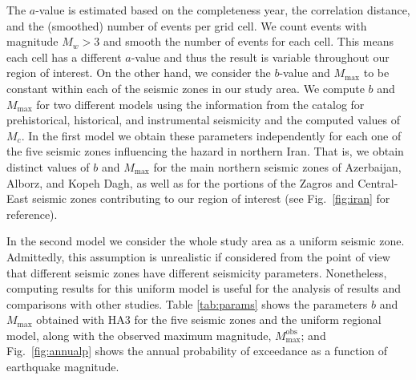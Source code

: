 The $a$-value is estimated based on the completeness year, the correlation distance, and the (smoothed) number of events per grid cell. We count events with magnitude $M_w > 3$ and smooth the number of events for each cell. This means each cell has a different $a$-value and thus the result is variable throughout our region of interest. On the other hand, we consider the $b$-value and $M_{\max}$ to be constant within each of the seismic zones in our study area. We compute $b$ and $M_{\max}$ for two different models using the information from the catalog for prehistorical, historical, and instrumental seismicity and the computed values of $M_c$. In the first model we obtain these parameters independently for each one of the five seismic zones influencing the hazard in northern Iran. That is, we obtain distinct values of $b$ and $M_{\max}$ for the main northern seismic zones of Azerbaijan, Alborz, and Kopeh Dagh, as well as for the portions of the Zagros and Central-East seismic zones contributing to our region of interest (see Fig.~\ref{fig:iran} for reference). 

In the second model we consider the whole study area as a uniform seismic zone. Admittedly, this assumption is unrealistic if considered from the point of view that different seismic zones have different seismicity parameters. Nonetheless, computing results for this uniform model is useful for the analysis of results and comparisons with other studies. Table \ref{tab:params} shows the parameters $b$ and $M_{\max}$ obtained with HA3 for the five seismic zones and the uniform regional model, along with the observed maximum magnitude, $M_{\max}^{\mathrm{obs}}$; and Fig.~\ref{fig:annualp} shows the annual probability of exceedance as a function of earthquake magnitude.

